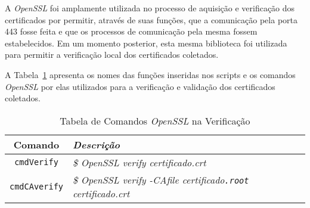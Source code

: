 		A \textit{OpenSSL} foi amplamente utilizada no processo de aquisição e verificação dos certificados por permitir, através de suas funções, que a comunicação pela porta 443  fosse feita e que os processos de comunicação pela mesma  fossem estabelecidos. Em um momento posterior, esta mesma biblioteca foi utilizada para permitir a verificação local dos certificados coletados.

		A Tabela~\ref{tab:cmds02} apresenta os nomes das funções inseridas nos scripts e os comandos \textit{OpenSSL} por elas utilizados para a verificação e validação dos certificados coletados.

	    \begin{table}[h]
			\centering
			\caption{Tabela de Comandos \textit{OpenSSL} na Verificação}
			\label{tab:cmds02}
			\begin{tabular}{c>{\em}l}
			\toprule
			\textbf{Comando} & \textbf{Descrição} \\ \midrule
			\texttt{cmdVerify} & \$ \textit{OpenSSL} verify certificado.crt \\ 
			\rowcolor[gray]{0.9}
			\texttt{cmdCAverify} & \$ \textit{OpenSSL} verify -CAfile certificado\texttt{.root} certificado.crt \\
			\bottomrule
			\end{tabular}
		\end{table}
